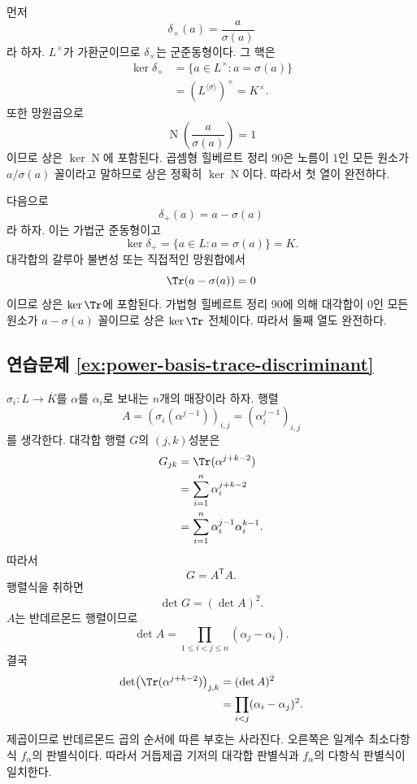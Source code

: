 \begin{solution}
먼저
\[
  \delta_\times(a)=\frac{a}{\sigma(a)}
\]
라 하자. $L^\times$가 가환군이므로 $\delta_\times$는 군준동형이다. 그 핵은
\[
\begin{aligned}
  \ker\delta_\times
  &=\{a\in L^\times:a=\sigma(a)\}\\
  &=(L^{\langle\sigma\rangle})^\times=K^\times.
\end{aligned}
\]
또한 망원곱으로
\[
  \operatorname N\left(\frac{a}{\sigma(a)}\right)=1
\]
이므로 상은 $\ker\operatorname N$에 포함된다. 곱셈형 힐베르트 정리 90은 노름이 $1$인 모든 원소가 $a/\sigma(a)$ 꼴이라고 말하므로 상은 정확히 $\ker\operatorname N$이다. 따라서 첫 열이 완전하다.

다음으로
\[
  \delta_+(a)=a-\sigma(a)
\]
라 하자. 이는 가법군 준동형이고
\[
  \ker\delta_+
  =\{a\in L:a=\sigma(a)\}=K.
\]
대각합의 갈루아 불변성 또는 직접적인 망원합에서
\[
  \Tr(a-\sigma(a))=0
\]
이므로 상은 $\ker\Tr$에 포함된다. 가법형 힐베르트 정리 90에 의해 대각합이 $0$인 모든 원소가 $a-\sigma(a)$ 꼴이므로 상은 $\ker\Tr$ 전체이다. 따라서 둘째 열도 완전하다.
\end{solution}

\subsection*{연습문제 \ref{ex:power-basis-trace-discriminant}}

\begin{solution}
$\sigma_i:L\to\overline K$를 $\alpha$를 $\alpha_i$로 보내는 $n$개의 매장이라 하자. 행렬
\[
  A=(\sigma_i(\alpha^{j-1}))_{i,j}
  =(\alpha_i^{j-1})_{i,j}
\]
를 생각한다. 대각합 행렬 $G$의 $(j,k)$성분은
\[
\begin{aligned}
  G_{jk}
  &=\Tr(\alpha^{j+k-2})\\
  &=\sum_{i=1}^n\alpha_i^{j+k-2}\\
  &=\sum_{i=1}^n
    \alpha_i^{j-1}\alpha_i^{k-1}.
\end{aligned}
\]
따라서
\[
  G=A^{\mathsf T}A.
\]
행렬식을 취하면
\[
  \det G=(\det A)^2.
\]
$A$는 반데르몬드 행렬이므로
\[
  \det A=\prod_{1\le i<j\le n}(\alpha_j-\alpha_i).
\]
결국
\[
\begin{aligned}
  \det\bigl(\Tr(\alpha^{j+k-2})\bigr)_{j,k}
  &=(\det A)^2\\
  &=\prod_{i<j}(\alpha_i-\alpha_j)^2.
\end{aligned}
\]
제곱이므로 반데르몬드 곱의 순서에 따른 부호는 사라진다. 오른쪽은 일계수 최소다항식 $f_\alpha$의 판별식이다. 따라서 거듭제곱 기저의 대각합 판별식과 $f_\alpha$의 다항식 판별식이 일치한다.
\end{solution}
